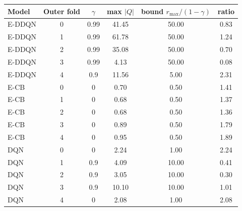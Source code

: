 \begin{tabular}{lccccc}
\toprule
Model & Outer fold & $\gamma$ & max $|Q|$ & bound $r_{\max}/(1-\gamma)$ & ratio \\
\midrule
E-DDQN & 0 & 0.99 & 41.45 & 50.00 & 0.83 \\
E-DDQN & 1 & 0.99 & 61.78 & 50.00 & 1.24 \\
E-DDQN & 2 & 0.99 & 35.08 & 50.00 & 0.70 \\
E-DDQN & 3 & 0.99 & 4.13 & 50.00 & 0.08 \\
E-DDQN & 4 & 0.9 & 11.56 & 5.00 & 2.31 \\
E-CB & 0 & 0 & 0.70 & 0.50 & 1.41 \\
E-CB & 1 & 0 & 0.68 & 0.50 & 1.37 \\
E-CB & 2 & 0 & 0.68 & 0.50 & 1.36 \\
E-CB & 3 & 0 & 0.89 & 0.50 & 1.79 \\
E-CB & 4 & 0 & 0.95 & 0.50 & 1.89 \\
DQN & 0 & 0 & 2.24 & 1.00 & 2.24 \\
DQN & 1 & 0.9 & 4.09 & 10.00 & 0.41 \\
DQN & 2 & 0.9 & 3.05 & 10.00 & 0.30 \\
DQN & 3 & 0.9 & 10.10 & 10.00 & 1.01 \\
DQN & 4 & 0 & 2.08 & 1.00 & 2.08 \\
\bottomrule
\end{tabular}
